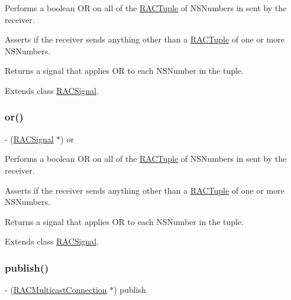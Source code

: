 Performs a boolean OR on all of the \mbox{\hyperlink{interface_r_a_c_tuple}{R\+A\+C\+Tuple}} of N\+S\+Numbers in sent by the receiver.

Asserts if the receiver sends anything other than a \mbox{\hyperlink{interface_r_a_c_tuple}{R\+A\+C\+Tuple}} of one or more N\+S\+Numbers.

Returns a signal that applies OR to each N\+S\+Number in the tuple. 

Extends class \mbox{\hyperlink{interface_r_a_c_signal_aaf19b8314c8e554a7e5140ebffcd4f98}{R\+A\+C\+Signal}}.

\mbox{\label{category_r_a_c_signal_07_operations_08_aaf19b8314c8e554a7e5140ebffcd4f98}} 
\subsubsection{\texorpdfstring{or()}{or()}\hspace{0.1cm}{\footnotesize\ttfamily [3/3]}}
{\footnotesize\ttfamily -\/ (\mbox{\hyperlink{interface_r_a_c_signal}{R\+A\+C\+Signal}} $\ast$) or \begin{DoxyParamCaption}{ }\end{DoxyParamCaption}}

Performs a boolean OR on all of the \mbox{\hyperlink{interface_r_a_c_tuple}{R\+A\+C\+Tuple}} of N\+S\+Numbers in sent by the receiver.

Asserts if the receiver sends anything other than a \mbox{\hyperlink{interface_r_a_c_tuple}{R\+A\+C\+Tuple}} of one or more N\+S\+Numbers.

Returns a signal that applies OR to each N\+S\+Number in the tuple. 

Extends class \mbox{\hyperlink{interface_r_a_c_signal_aaf19b8314c8e554a7e5140ebffcd4f98}{R\+A\+C\+Signal}}.

\mbox{\label{category_r_a_c_signal_07_operations_08_a16f260eea2cfd9a3953b95926d442a93}} 
\subsubsection{\texorpdfstring{publish()}{publish()}\hspace{0.1cm}{\footnotesize\ttfamily [1/3]}}
{\footnotesize\ttfamily -\/ (\mbox{\hyperlink{interface_r_a_c_multicast_connection}{R\+A\+C\+Multicast\+Connection}} $\ast$) publish \begin{DoxyParamCaption}{ }\end{DoxyParamCaption}}

